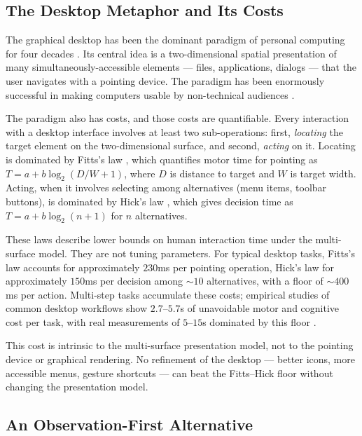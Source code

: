 \documentclass[11pt,twocolumn,a4paper]{article}
\theoremstyle{definition}
\theoremstyle{remark}
\begin{document}
\subsection{The Desktop Metaphor and Its Costs}

The graphical desktop has been the dominant paradigm of personal computing for four decades \citep{kay1977personal, smith1982star, apple1985macintosh}. Its central idea is a two-dimensional spatial presentation of many simultaneously-accessible elements --- files, applications, dialogs --- that the user navigates with a pointing device. The paradigm has been enormously successful in making computers usable by non-technical audiences \citep{shneiderman1983direct}.

The paradigm also has costs, and those costs are quantifiable. Every interaction with a desktop interface involves at least two sub-operations: first, \emph{locating} the target element on the two-dimensional surface, and second, \emph{acting} on it. Locating is dominated by Fitts's law \citep{fitts1954information}, which quantifies motor time for pointing as $T = a + b \log_2(D/W + 1)$, where $D$ is distance to target and $W$ is target width. Acting, when it involves selecting among alternatives (menu items, toolbar buttons), is dominated by Hick's law \citep{hick1952rate}, which gives decision time as $T = a + b \log_2(n+1)$ for $n$ alternatives.

These laws describe lower bounds on human interaction time under the multi-surface model. They are not tuning parameters. For typical desktop tasks, Fitts's law accounts for approximately $230$ms per pointing operation, Hick's law for approximately $150$ms per decision among $\sim 10$ alternatives, with a floor of $\sim 400$ms per action. Multi-step tasks accumulate these costs; empirical studies of common desktop workflows show $2.7$--$5.7$s of unavoidable motor and cognitive cost per task, with real measurements of $5$--$15$s dominated by this floor \citep{card1983psychology}.

This cost is intrinsic to the multi-surface presentation model, not to the pointing device or graphical rendering. No refinement of the desktop --- better icons, more accessible menus, gesture shortcuts --- can beat the Fitts--Hick floor without changing the presentation model.

\subsection{An Observation-First Alternative}
\end{document}
